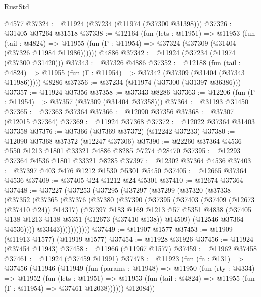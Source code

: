 \begin{lexlean}{RustStd}
\begin{coremodule}
    @4577
@37324 := @11924 (@37234 (@11974 (@37300 @31398)))
@37326 := @31405 @37264 @31518
@37338 := @12164
    (fun (lets : @11951) =>
    @11953
      (fun (tail : @4824) =>
      @11955 (fun (Γ : @11954) => @37324 (@37309 (@31404 (@37326 @11984 @11986))))))
    @4886
@37342 := @11924 (@37234 (@11974 (@37300 @31420)))
@37343 := @37326 @4886
@37352 := @12188
    (fun (tail : @4824) => @11955 (fun (Γ : @11954) => @37342 (@37309 (@31404 (@37343 @11986)))))
    @8286
@37356 := @37234 (@11974 (@37300 (@31397 @36386)))
@37357 := @11924 @37356
@37358 := @37343 @8286
@37363 := @12206 (fun (Γ : @11954) => @37357 (@37309 (@31404 @37358)))
@37364 := @31193 @31450
@37365 := @37363 @37364
@37366 := @12090 @37356
@37368 := @37307 (@12015 @37364)
@37369 := @11924 @37368
@37372 := @12022 @37364 @31403 @37358
@37376 := @37366 (@37369 @37372) (@12242 @37233)
@37380 := @12090 @37368 @37372 (@12247 @37306)
@37390 := @22260 @37364 @4536 @550 @1213 @1801 @33321 @4886 @8285 @7274 @28470
@37395 := @12293 @37364 @4536 @1801 @33321 @8285
@37397 := @12302 @37364 @4536
@37403 := @37397 @403 @476 @1212 @1530 @5301 @5450
@37405 := @12665 @37364 @4536
@37409 := @37405 @24 @1212 @24 @5301
@37410 := @12674 @37364
@37448 := @37227
    (@37253
      (@37295
        (@37297
          (@37299
            (@37320
              (@37338
                (@37352
                  (@37365
                    (@37376
                      (@37380
                        (@37390
                          (@37395
                            (@37403
                              (@37409 (@12673 (@37410 @24)) @14317)
                              (@37397
                                @183
                                @169
                                @1213
                                @57
                                @5351
                                @4838
                                (@37405 @138 @1213 @138 @5351 (@12673 (@37410 @138)) @14509)
                                (@12546 @37364 @4536))))
                          @33443)))))))))))
@37449 := @11907 @1577
@37453 := @11909 (@11913 @1577) (@11919 @1577)
@37454 := @11928 @31926
@37456 := @11924 (@37454 @11943)
@37458 := @11966 (@11967 @1577)
@37459 := @11962 @37458
@37461 := @11924 (@37459 @11991)
@37478 := @11923
    (fun (fn : @131) =>
    @37456
      (@11946
        (@11949
          (fun (params : @11948) =>
          @11950
            (fun (rty : @4334) =>
            @11952
              (fun (lets : @11951) =>
              @11953 (fun (tail : @4824) => @11955 (fun (Γ : @11954) => @37461 @12038))))))
        @12084))

\end{coremodule}
\end{lexlean}
